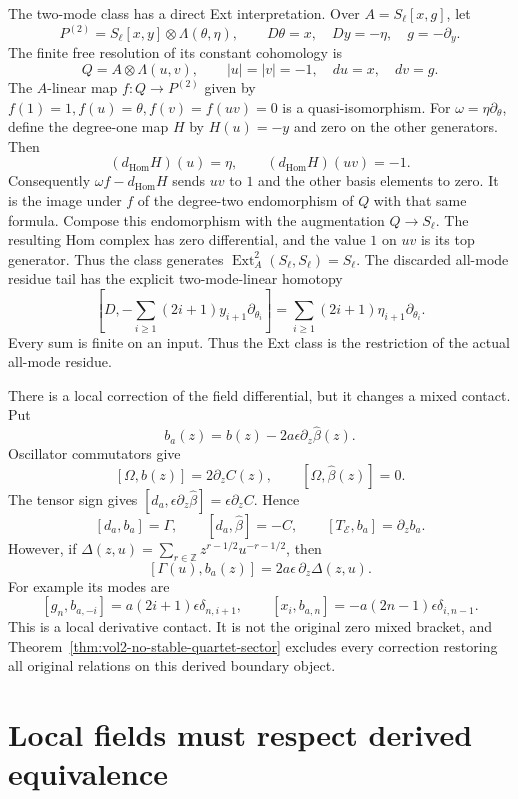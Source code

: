 The two-mode class has a direct Ext interpretation. Over
\(A=S_\ell[x,g]\), let
\[
 P^{(2)}=S_\ell[x,y]\otimes\Lambda(\theta,\eta),
 \qquad D\theta=x,\quad Dy=-\eta,\quad g=-\partial_y.
\]
The finite free resolution of its constant cohomology is
\[
 Q=A\otimes\Lambda(u,v),\qquad
 |u|=|v|=-1,\quad du=x,\quad dv=g.
\]
The \(A\)-linear map \(f:Q\to P^{(2)}\) given by
\(f(1)=1,f(u)=\theta,f(v)=f(uv)=0\) is a quasi-isomorphism.
For \(\omega=\eta\partial_\theta\), define the degree-one
map \(H\) by \(H(u)=-y\) and zero on the other generators.
Then
\[
 (d_{\operatorname{Hom}}H)(u)=\eta,\qquad
 (d_{\operatorname{Hom}}H)(uv)=-1.
\]
Consequently \(\omega f-d_{\operatorname{Hom}}H\) sends
\(uv\) to \(1\) and the other basis elements to zero.
It is the image under \(f\) of the degree-two endomorphism
of \(Q\) with that same formula. Compose this endomorphism
with the augmentation \(Q\to S_\ell\). The resulting
Hom complex has zero differential, and the value \(1\)
on \(uv\) is its top generator. Thus the class generates
\(\operatorname{Ext}^2_A(S_\ell,S_\ell)=S_\ell\).
The discarded all-mode residue tail has the explicit
two-mode-linear homotopy
\[
 \left[D,-\sum_{i\ge1}(2i+1)y_{i+1}\partial_{\theta_i}\right]
   =\sum_{i\ge1}(2i+1)\eta_{i+1}\partial_{\theta_i}.
\]
Every sum is finite on an input. Thus the Ext class is the
restriction of the actual all-mode residue.

There is a local correction of the field differential, but
it changes a mixed contact. Put
\[
 b_a(z)=b(z)-2a\epsilon\partial_z\widehat\beta(z).
\]
Oscillator commutators give
\[
 [\Omega,b(z)]=2\partial_zC(z),\qquad
 [\Omega,\widehat\beta(z)]=0.
\]
The tensor sign gives
\([d_a,\epsilon\partial_z\widehat\beta]=\epsilon\partial_zC\).
Hence
\[
 [d_a,b_a]=\Gamma,\qquad
 [d_a,\widehat\beta]=-C,\qquad [T_{\mathcal E},b_a]=\partial_zb_a.
\]
However, if
\(\Delta(z,u)=\sum_{r\in\mathbb Z}z^{r-1/2}u^{-r-1/2}\),
then
\begin{equation}\label{eq:vol2-quartet-derivative-contact}
 [\Gamma(u),b_a(z)]=2a\epsilon\,\partial_z\Delta(z,u).
\end{equation}
For example its modes are
\[
 [g_n,b_{a,-i}]=a(2i+1)\epsilon\delta_{n,i+1},\qquad
 [x_i,b_{a,n}]=-a(2n-1)\epsilon\delta_{i,n-1}.
\]
This is a local derivative contact. It is not the original
zero mixed bracket, and
Theorem~\ref{thm:vol2-no-stable-quartet-sector} excludes
every correction restoring all original relations on this
derived boundary object.

\section{Local fields must respect derived equivalence}
\label{sec:vol2-polynomial-fields-derived}

